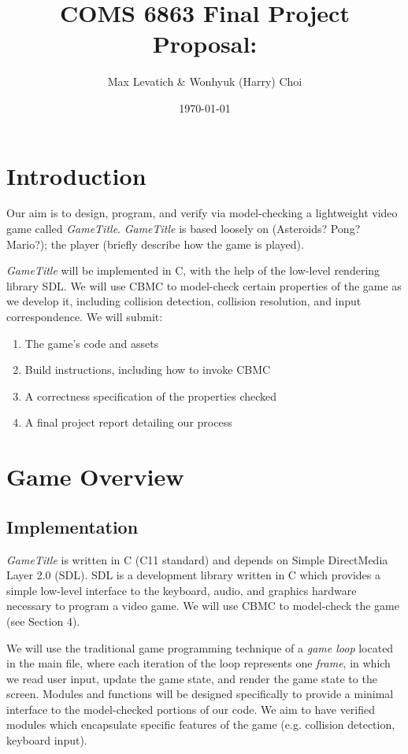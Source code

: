 \documentclass{article}
\title{COMS 6863 Final Project Proposal: \Name{}}
\author{Max Levatich \& Wonhyuk (Harry) Choi}
\date{\today}
\newcommand{\Name}{\textit{GameTitle}}
\begin{document}
\maketitle

\section{Introduction}

    Our aim is to design, program, and verify via model-checking a lightweight
    video game called \Name{}. \Name{} is based loosely on (Asteroids? Pong?
    Mario?); the player (briefly describe how the game is played).

    \Name{} will be implemented in C, with the help of the low-level rendering
    library SDL. We will use CBMC \cite{clarke2004tool} to model-check
    certain properties of the game as we develop it, including collision
    detection, collision resolution, and input correspondence. We will submit:

    \begin{enumerate}
        \item{The game's code and assets}
        \item{Build instructions, including how to invoke CBMC}
        \item{A correctness specification of the properties checked}
        \item{A final project report detailing our process}
    \end{enumerate}

\section{Game Overview}

    \subsection{Implementation}

        \Name{} is written in C (C11 standard) and depends on Simple DirectMedia
        Layer 2.0 (SDL). SDL is a development library written in C which
        provides a simple low-level interface to the keyboard, audio, and
        graphics hardware necessary to program a video game. We will use CBMC
        to model-check the game (see Section 4).

        We will use the traditional game programming technique of a \textit{game
        loop} located in the main file, where each iteration of the loop
        represents one \textit{frame}, in which we read user input, update the
        game state, and render the game state to the screen. Modules and
        functions will be designed specifically to provide a minimal interface
        to the model-checked portions of our code. We aim to have verified
        modules which encapsulate specific features of the game (e.g. collision
        detection, keyboard input).
\end{document}
